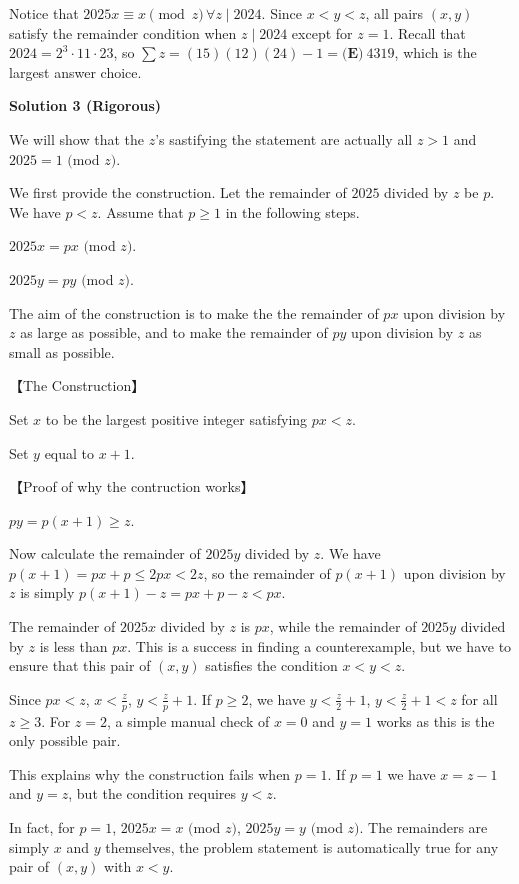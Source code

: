 \begin{enumerate}
Notice that $2025x \equiv x \pmod{z} \, \forall z \mid 2024$. Since $x<y<z$, all pairs $(x,y)$ satisfy the remainder condition when $z\mid 2024$ except for $z=1$. Recall that $2024=2^3\cdot 11 \cdot 23$, so $\sum z=(15)(12)(24)-1=\boxed{\textbf{(E)}~4319}$, which is the largest answer choice.

 


 



\textbf{Solution 3 (Rigorous)}

We will show that the $z$'s sastifying the statement are actually all $z>1$ and $2025=1$ $($mod $z)$.

 
We first provide the construction. Let the remainder of $2025$ divided by $z$ be $p$. We have $p<z$. Assume that $p\geq{1}$ in the following steps.

 
$2025x=px$ $($mod $z)$.

 $2025y=py$ $($mod $z)$.

 
The aim of the construction is to make the the remainder of $px$ upon division by $z$ as large as possible, and to make the remainder of $py$ upon division by $z$ as small as possible.

 
【The Construction】

 
Set $x$ to be the largest positive integer satisfying $px<z$.

 Set $y$ equal to $x+1$. 

 
【Proof of why the contruction works】

 
$py=p(x+1)\geq{z}$.

 
Now calculate the remainder of $2025y$ divided by $z$. We have $p(x+1)=px+p\leq{2px}<2z$, so the remainder of $p(x+1)$ upon division by $z$ is simply $p(x+1)-z=px+p-z<px$.

 
The remainder of $2025x$ divided by $z$ is $px$, while the remainder of $2025y$ divided by $z$ is less than $px$. This is a success in finding a counterexample, but we have to ensure that this pair of $(x,y)$ satisfies the condition $x<y<z$.

 
Since $px<z$, $x<\frac{z}{p}$, $y<\frac{z}{p}+1$. If $p\geq{2}$, we have $y<\frac{z}{2}+1$, $y<\frac{z}{2}+1<z$ for all $z\geq{3}$. For $z=2$, a simple manual check of $x=0$ and $y=1$ works as this is the only possible pair.

 


 This explains why the construction fails when $p=1$. If $p=1$ we have $x=z-1$ and $y=z$, but the condition requires $y<z$.

 
In fact, for $p=1$, $2025x=x$ $($mod $z)$, $2025y=y$ $($mod $z)$. The remainders are simply $x$ and $y$ themselves, the problem statement is automatically true for any pair of $(x,y)$ with $x<y$.


\end{enumerate}

